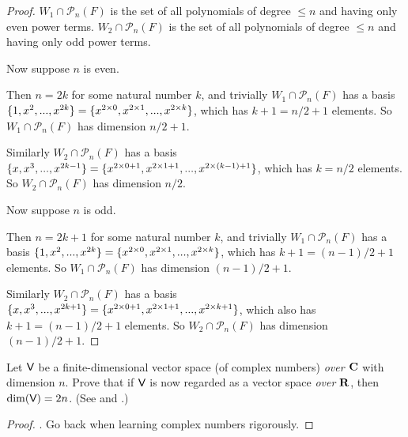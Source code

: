 \begin{proof}
\(W_1 \cap \mathcal{P}_n(F)\) is the set of all polynomials of degree \(\le n\) and having only even power terms.
\(W_2 \cap \mathcal{P}_n(F)\) is the set of all polynomials of degree \(\le n\) and having only odd power terms.

Now suppose \(n\) is even.

Then \(n = 2k\) for some natural number \(k\), and trivially \(W_1 \cap \mathcal{P}_n(F)\) has a basis \(\{ 1, x^2, ..., x^{2k} \} = \{ x^{2 \times 0}, x^{2 \times 1}, ..., x^{2 \times k} \}\), which has \(k + 1 = n/2 + 1\) elements.
So \(W_1 \cap \mathcal{P}_n(F)\) has dimension \(n/2 + 1\).

Similarly \(W_2 \cap \mathcal{P}_n(F)\) has a basis \(\{ x, x^3, ..., x^{2k - 1} \} = \{ x^{2 \times 0 + 1}, x^{2 \times 1 + 1}, ..., x^{2 \times (k - 1) + 1} \}\), which has \(k = n/2\) elements.
So \(W_2 \cap \mathcal{P}_n(F)\) has dimension \(n/2\).

Now suppose \(n\) is odd.

Then \(n = 2k + 1\) for some natural number \(k\), and trivially \(W_1 \cap \mathcal{P}_n(F)\) has a basis \(\{ 1, x^2, ..., x^{2k} \} = \{ x^{2 \times 0}, x^{2 \times 1}, ..., x^{2 \times k} \}\), which has \(k + 1 = (n - 1)/2 + 1\) elements.
So \(W_1 \cap \mathcal{P}_n(F)\) has dimension \((n - 1)/2 + 1\).

Similarly \(W_2 \cap \mathcal{P}_n(F)\) has a basis \(\{ x , x^3, ..., x^{2k + 1} \} = \{ x^{2 \times 0 + 1}, x^{2 \times 1 + 1}, ..., x^{2 \times k + 1} \}\), which also has \(k + 1 = (n - 1)/2 + 1\) elements.
So \(W_2 \cap \mathcal{P}_n(F)\) has dimension \((n - 1)/2 + 1\).
\end{proof}

\begin{exercise} \label{exercise 1.6.28}
Let \(\textsf{V}\) be a finite-dimensional vector space (of complex numbers) \emph{over \(\mathbf{C}\)} with dimension \(n\).
Prove that if \(\textsf{V}\) is now regarded as a vector space \emph{over \(\mathbf{R}\)}, then \(\dim(\textsf{V}) = 2n\).
(See  and .)
\end{exercise}

\begin{proof}
\TODOREF {}.
Go back when learning complex numbers rigorously.
\end{proof}

